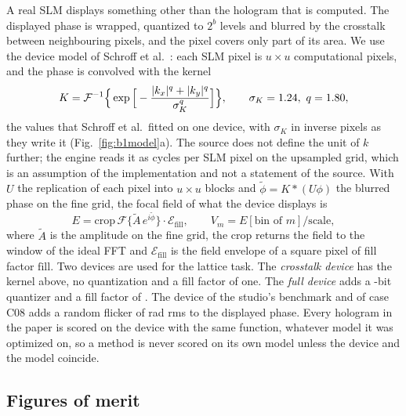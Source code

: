 A real SLM displays something other than the hologram that is computed. The displayed phase is wrapped, quantized to $2^b$ levels and blurred by the crosstalk between neighbouring pixels, and the pixel covers only part of its area. We use the device model
of Schroff et al.~\cite{schroff}: each SLM pixel is $u\times u$ computational pixels, and the phase is convolved with the kernel
\begin{equation}
K=\mathcal F^{-1}\Big\{\exp\Big[-\frac{|k_x|^q+|k_y|^q}{\sigma_K^q}\Big]\Big\},\qquad \sigma_K=1.24,\ q=1.80,\label{eq:kernel}
\end{equation}
the values that Schroff et al.\ fitted on one device, with $\sigma_K$ in inverse pixels as they write it (Fig.~\ref{fig:b1model}a). The source does not define the unit of $k$ further; the engine reads it as cycles per SLM pixel on the upsampled grid, which is an assumption of the implementation and not a statement of the source. With $U$ the replication of each pixel into $u\times u$ blocks and $\tilde\phi=K*(U\phi)$ the blurred phase on the fine grid, the focal field of what the device displays is
\begin{equation}
E=\mathrm{crop}\,\mathcal F\{\tilde A\,e^{i\tilde\phi}\}\cdot\mathcal E_{\mathrm{fill}},\qquad V_m=E[\text{bin of }m]/\mathrm{scale},\label{eq:devicefield}
\end{equation}
where $\tilde A$ is the amplitude on the fine grid, the crop returns the field to the window of the ideal FFT and $\mathcal E_{\mathrm{fill}}$ is the field envelope of a square pixel of fill factor $\mathrm{fill}$. Two devices are used for the lattice task. The
\emph{crosstalk device} has the kernel above, no quantization and a fill factor of one. The \emph{full device} adds a \parBits{}-bit quantizer and a fill factor of \parFill. The device of the studio's benchmark and of case C08 adds a random flicker of \bakeCeightFlicker{} rad rms
to the displayed phase. Every hologram in the paper is scored on the device with the same function, whatever model it was optimized on, so a method is never scored on its own model unless the device and the model coincide.

\subsection{Figures of merit}

